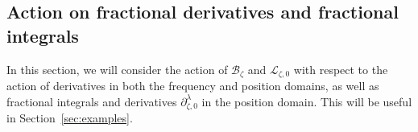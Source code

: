 \documentclass{article}
\newcommand{\singexp}[2]{\mathcal{H}L^\infty_{#1, #2}}
\newcommand{\singexpalg}[1]{\singexp{#1}{\bullet}}
\newcommand{\C}{\mathbb{C}}
\newcommand{\fracderiv}[3]{\partial^{#1}_{#2, #3}}
\newcommand{\laplace}{\mathcal{L}}
\newcommand{\borel}{\mathcal{B}}
\theoremstyle{definition}
\theoremstyle{plain}
\newtheorem{prop}[definition]{Proposition}
\begin{document}
%
%
\subsection{Action on fractional derivatives and fractional integrals}\label{sec:frac-diff-laplace}
In this section, we will consider the action of $\borel_\zeta$ and $\laplace_{\zeta,0}$ with respect to the action of derivatives in both the frequency and position domains, as well as fractional integrals and derivatives $\fracderiv{\lambda}{\zeta}{0}$ in the position domain. This will be useful in Section~\ref{sec:examples}. 
\end{document}
